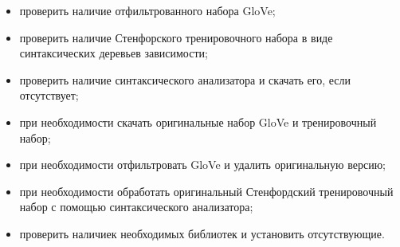 \begin{itemize}
\item проверить наличие отфильтрованного набора GloVe;
\item проверить наличие Стенфорского тренировочного набора в виде синтаксических деревьев зависимости;
\item проверить наличие синтаксического анализатора и скачать его, если отсутствует;
\item при необходимости скачать оригинальные набор GloVe и тренировочный набор;
\item при необходимости отфильтровать GloVe и удалить оригинальную версию;
\item при необходимости обработать оригинальный Стенфордский тренировочный набор с помощью синтаксического анализатора;
\item проверить наличиек необходимых библиотек и установить отсутствующие.
\end{itemize}
